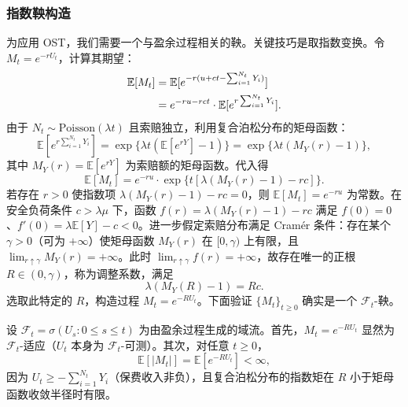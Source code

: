\subsubsection{指数鞅构造}

为应用 OST，我们需要一个与盈余过程相关的鞅。关键技巧是取指数变换\cite{gerber1979introduction}。令 $M_t = e^{-r U_t}$，计算其期望：
\begin{align}
  \mathbb{E}[M_t] &= \mathbb{E}[e^{-r(u + ct - \sum_{i=1}^{N_t} Y_i)}] \notag\\
  &= e^{-ru - rct} \cdot \mathbb{E}[e^{r \sum_{i=1}^{N_t} Y_i}].
\end{align}
由于 $N_t \sim \text{Poisson}(\lambda t)$ 且索赔独立，利用复合泊松分布的矩母函数：
\begin{equation}
  \mathbb{E}[e^{r \sum_{i=1}^{N_t} Y_i}] = \exp\{\lambda t (\mathbb{E}[e^{r Y}] - 1)\} = \exp\{\lambda t (M_Y(r) - 1)\},
\end{equation}
其中 $M_Y(r) = \mathbb{E}[e^{r Y}]$ 为索赔额的矩母函数。代入得
\begin{equation}
  \mathbb{E}[M_t] = e^{-ru} \cdot \exp\{t[\lambda(M_Y(r) - 1) - rc]\}.
\end{equation}
若存在 $r > 0$ 使指数项 $\lambda(M_Y(r) - 1) - r c = 0$，则 $\mathbb{E}[M_t] = e^{-ru}$ 为常数。在安全负荷条件 $c > \lambda\mu$ 下，函数 $f(r) = \lambda(M_Y(r) - 1) - r c$ 满足 $f(0)=0$、$f'(0) = \lambda \mathbb{E}[Y] - c < 0$。进一步假定索赔分布满足 Cram\'{e}r 条件：存在某个 $\gamma > 0$（可为 $+\infty$）使矩母函数 $M_Y(r)$ 在 $[0, \gamma)$ 上有限，且 $\lim_{r \uparrow \gamma} M_Y(r) = +\infty$。此时 $\lim_{r \uparrow \gamma} f(r) = +\infty$，故存在唯一的正根 $R \in (0, \gamma)$，称为调整系数，满足
\begin{equation}\label{eq:lundberg_eq}
  \lambda(M_Y(R) - 1) = R c.
\end{equation}
选取此特定的 $R$，构造过程 $M_t = e^{-R U_t}$。下面验证 $\{M_t\}_{t \geqslant 0}$ 确实是一个 $\mathcal{F}_t$-鞅。

设 $\mathcal{F}_t = \sigma(U_s: 0 \leqslant s \leqslant t)$ 为由盈余过程生成的域流。首先，$M_t = e^{-R U_t}$ 显然为 $\mathcal{F}_t$-适应（$U_t$ 本身为 $\mathcal{F}_t$-可测）。其次，对任意 $t \geqslant 0$，
\[
  \mathbb{E}[|M_t|] = \mathbb{E}[e^{-R U_t}] < \infty,
\]
因为 $U_t \geqslant - \sum_{i=1}^{N_t} Y_i$（保费收入非负），且复合泊松分布的指数矩在 $R$ 小于矩母函数收敛半径时有限。

